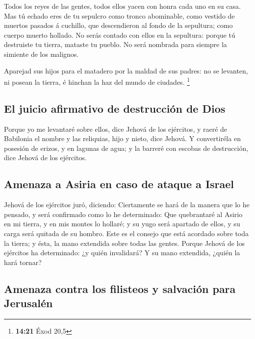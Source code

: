  Todos los reyes de las gentes, todos ellos yacen con honra
cada uno en su casa.  Mas tú echado eres de tu sepulcro
como tronco abominable, como vestido de muertos pasados á cuchillo, que
descendieron al fondo de la sepultura; como cuerpo muerto hollado.
 No serás contado con ellos en la sepultura: porque tú
destruiste tu tierra, mataste tu pueblo. No será nombrada para siempre
la simiente de los malignos.

 Aparejad sus hijos para el matadero por la maldad de sus
padres: no se levanten, ni posean la tierra, é hinchan la haz del mundo
de ciudades. \footnote{\textbf{14:21} Éxod 20,5}

\hypertarget{el-juicio-afirmativo-de-destrucciuxf3n-de-dios}{%
\subsection{El juicio afirmativo de destrucción de
Dios}\label{el-juicio-afirmativo-de-destrucciuxf3n-de-dios}}

 Porque yo me levantaré sobre ellos, dice Jehová de los
ejércitos, y raeré de Babilonia el nombre y las reliquias, hijo y nieto,
dice Jehová.  Y convertiréla en posesión de erizos, y en
lagunas de agua; y la barreré con escobas de destrucción, dice Jehová de
los ejércitos.

\hypertarget{amenaza-a-asiria-en-caso-de-ataque-a-israel}{%
\subsection{Amenaza a Asiria en caso de ataque a
Israel}\label{amenaza-a-asiria-en-caso-de-ataque-a-israel}}

 Jehová de los ejércitos juró, diciendo: Ciertamente se
hará de la manera que lo he pensado, y será confirmado como lo he
determinado:  Que quebrantaré al Asirio en mi tierra, y en
mis montes lo hollaré; y su yugo será apartado de ellos, y su carga será
quitada de su hombro.  Este es el consejo que está acordado
sobre toda la tierra; y ésta, la mano extendida sobre todas las gentes.
 Porque Jehová de los ejércitos ha determinado: ¿y quién
invalidará? Y su mano extendida, ¿quién la hará tornar?

\hypertarget{amenaza-contra-los-filisteos-y-salvaciuxf3n-para-jerusaluxe9n}{%
\subsection{Amenaza contra los filisteos y salvación para
Jerusalén}\label{amenaza-contra-los-filisteos-y-salvaciuxf3n-para-jerusaluxe9n}}

